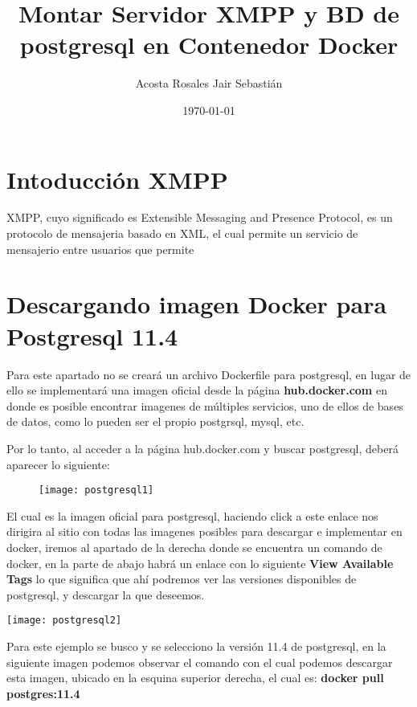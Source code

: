 \documentclass[10pt,letterpaper]{article}
\begin{document}
\title{Montar Servidor XMPP y BD de postgresql en Contenedor Docker}
\author{Acosta Rosales Jair Sebastián}
\date{\today}
\maketitle

\section{Intoducción XMPP}
XMPP, cuyo significado es Extensible Messaging and Presence Protocol, es un protocolo de mensajeria basado en XML, el cual permite un servicio de mensajerio entre usuarios que permite 

\section{Descargando imagen Docker para Postgresql 11.4}

Para este apartado no se creará un archivo Dockerfile para postgresql, en lugar de ello se implementará una imagen oficial desde la página \textbf{hub.docker.com} en donde es posible encontrar imagenes de múltiples servicios, uno de ellos de bases de datos, como lo pueden ser el propio postgrsql, mysql, etc.

Por lo tanto, al acceder a la página hub.docker.com y buscar postgresql, deberá aparecer lo siguiente:\\


\begin{figure}[htb]
\centering
\texttt{[image: postgresql1]}
\end{figure}

El cual es la imagen oficial para postgresql, haciendo click a este enlace nos dirigira al sitio con todas las imagenes posibles para descargar e implementar en docker, iremos al apartado de la derecha donde se encuentra un comando de docker, en la parte de abajo habrá un enlace con lo siguiente \textbf{View Available Tags} lo que significa que ahí podremos ver las versiones disponibles de postgresql, y descargar la que deseemos.

\begin{center}
\texttt{[image: postgresql2]}
\end{center}

Para este ejemplo se busco y se selecciono la versión 11.4 de postgresql, en la siguiente imagen podemos observar el comando con el cual podemos descargar esta imagen, ubicado en la esquina superior derecha, el cual es: \textbf{docker pull postgres:11.4}\\
\end{document}
